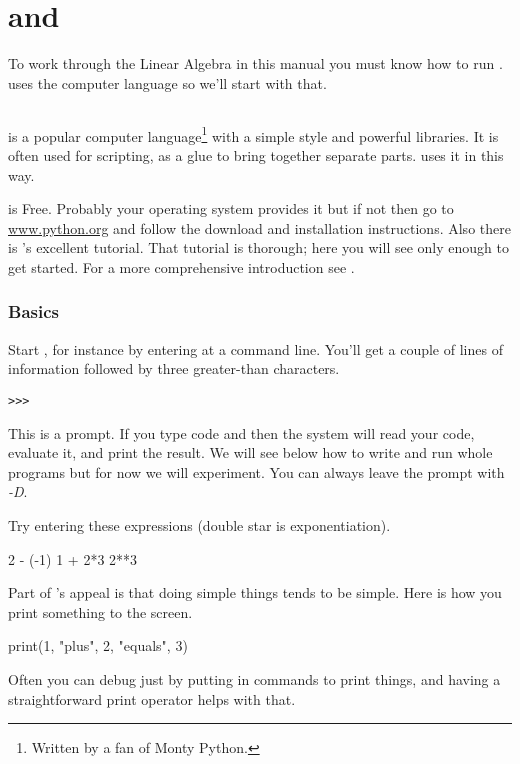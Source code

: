 \chapter{\python{} and \Sage{}}

To work through the Linear Algebra in this manual
you must know how to run \Sage. 
\Sage{} uses the computer language \python{} so we'll start with that.


\section{\python}
\python{} is a popular computer language\footnote{Written by a fan of
Monty Python.} 
with a simple style and powerful libraries.
It is often used for scripting, as a glue to bring together separate parts.
\Sage{} uses it in this way.

\python{} is Free.
Probably your operating system provides it but if not then go to 
\href{http://www.python.org}{\url{www.python.org}} and follow the
download and installation instructions.
Also there is \python's excellent tutorial.
That tutorial is thorough; 
here you will see only enough \python{} to get started.
For a more comprehensive introduction see \cite{PythonTeam12b}.


\subsection{Basics}
Start \python, for instance by entering 
at a command line.
You'll get a couple of lines of 
information followed by three greater-than
characters.
\begin{lstlisting}[style=python]
>>>   
\end{lstlisting}
This is a prompt.
If you type 
\python{} code and  then the system
will read your code, evaluate it, and print the result.
We will see below how to write and run whole programs
but for now we will experiment.
You can always leave the prompt with \textit{-D}.

Try entering these expressions (double star is exponentiation).
\begin{pythonconsole}
2 - (-1)
1 + 2*3
2**3  
\end{pythonconsole}

Part of \python's appeal is that doing simple things tends to be simple.
Here is how you print something to the screen.
\begin{pythonconsole}
print(1, "plus", 2, "equals", 3)
\end{pythonconsole}
Often you can debug just by putting in commands to print things, 
and having a straightforward print operator helps with that. 

